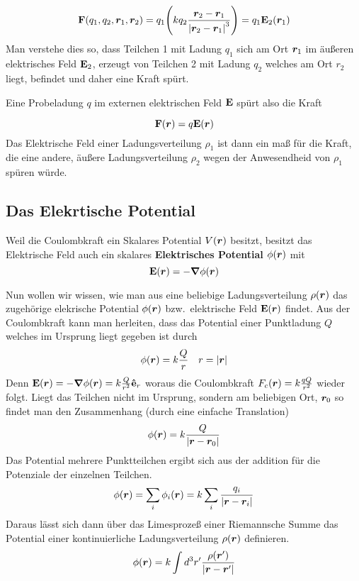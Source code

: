 \begin{equation*}
  \vb F(q_1, q_2, \vb*r_1, \vb*r_2) 
  = 
  q_1 
  \qty(k q_2 \frac{\vb*r_2 - \vb*r_1}{\abs{\vb*r_2 - \vb*r_1}^3})
  = q_1 \vb E_2(\vb*r_1)
\end{equation*}
Man verstehe dies so, dass Teilchen 1 mit Ladung $q_1$ 
sich am Ort $\vb*r_1$ im äußeren elektrisches Feld $\vb E_2$, 
erzeugt von Teilchen 2 mit Ladung $q_2$ welches am Ort $r_2$ liegt, befindet und daher eine Kraft spürt.

Eine Probeladung $q$ im externen elektrischen Feld $\vb E$ spürt also die Kraft

\begin{equation}
  \vb F(\vb*r) = q \vb E(\vb*r)
\end{equation}
Das Elektrische Feld einer Ladungsverteilung $\rho_1$ ist dann ein 
maß für die Kraft, die eine andere, äußere Ladungsverteilung $\rho_2$ 
wegen der Anwesendheid von $\rho_1$ spüren würde. 

\subsection{Das Elekrtische Potential}%
\label{ssub:E-pot}
Weil die Coulombkraft ein
Skalares Potential $V(\vb*r)$ besitzt, 
besitzt das Elektrische Feld auch ein skalares \textbf{Elektrisches Potential}
$\phi(\vb*r)$ mit
\begin{equation}
  \vb E(\vb*r)=-\grad \phi(\vb*r)
\end{equation}

Nun wollen wir wissen, wie man aus eine beliebige 
Ladungsverteilung $\rho(\vb*r)$ das zugehörige
elekrische Potential $\phi(\vb*r)$ bzw.\ elektrische Feld $\vb E(\vb*r)$ 
findet. Aus der Coulombkraft kann man herleiten, dass das Potential
einer Punktladung $Q$ welches im Ursprung liegt gegeben ist durch
\begin{equation*}
  \phi(\vb*r) = k  \frac{Q}{r} \quad r=\abs{\vb*r}
\end{equation*}
Denn $\vb E(\vb*r)=-\grad\phi(\vb*r)=k \frac{Q}{r^2}\vu e_r $ 
woraus die Coulombkraft $F_c(\vb*r)=k \frac{qQ}{r^2}$ wieder folgt.
Liegt das Teilchen nicht im Ursprung, sondern am beliebigen Ort, $\vb*r_0$
so findet man den Zusammenhang (durch eine einfache Translation)
\begin{equation*}
  \phi(\vb*r) = k \frac{Q}{\abs{\vb*r - \vb*r_0}}
\end{equation*}
Das Potential mehrere Punktteilchen ergibt sich aus der addition für die 
Potenziale der einzelnen Teilchen.
\begin{equation*}
  \phi(\vb*r) = \sum_i \phi_i(\vb*r) = k\sum_i \frac{q_i}{\abs{\vb*r-\vb*r_i}}
\end{equation*}
Daraus lässt sich dann über das Limesprozeß einer Riemannsche Summe das 
Potential einer kontinuierliche Ladungsverteilung $\rho(\vb*r)$ definieren.
\begin{equation}
  \label{eq:potential}
  \phi(\vb*r) = k \int d^3 r' \frac{\rho(\vb*r')}{\abs{\vb*r-\vb*r'}} 
\end{equation}

